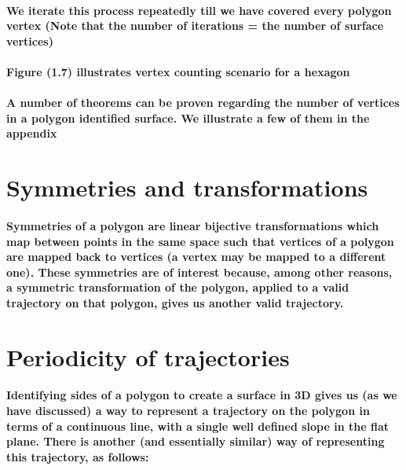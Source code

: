 \documentclass{article}
\begin{document}
\paragraph{We iterate this process repeatedly till we have covered every polygon vertex (Note that the number of iterations = the number of surface vertices)}

\paragraph{Figure (1.7) illustrates vertex counting scenario for a hexagon}


\paragraph{A number of theorems can be proven regarding the number of vertices in a polygon identified surface. We illustrate a few of them in the appendix}


\section{Symmetries and transformations}

\paragraph{Symmetries of a polygon are linear bijective transformations which map between points in the same space such that vertices of a polygon are mapped back to vertices (a vertex may be mapped to a different one). 
These symmetries are of interest because, among other reasons, a symmetric transformation of the polygon, applied to a valid trajectory on that polygon, gives us another valid trajectory.}


\section{Periodicity of trajectories}

\paragraph{Identifying sides of a polygon to create a surface in 3D gives us (as we have discussed) a way to represent a trajectory on the polygon in terms of a continuous line, with a single well defined slope in the flat plane. There is another (and essentially similar) way of representing this trajectory, as follows:}
\end{document}
